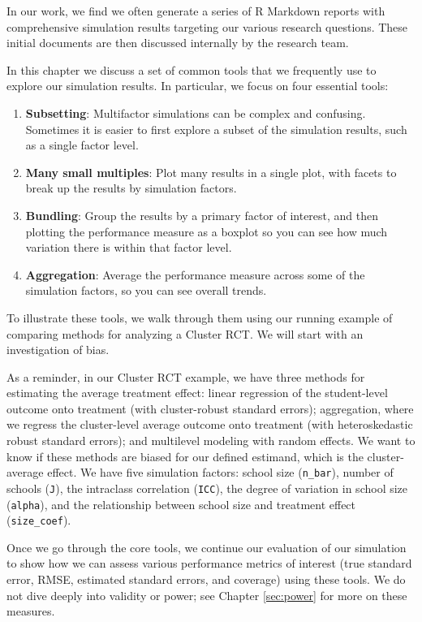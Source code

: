 \documentclass[
]{book}
\providecommand{\tightlist}{%
  \setlength{\itemsep}{0pt}\setlength{\parskip}{0pt}}
\begin{document}
In our work, we find we often generate a series of R Markdown reports with comprehensive simulation results targeting our various research questions.
These initial documents are then discussed internally by the research team.

In this chapter we discuss a set of common tools that we frequently use to explore our simulation results.
In particular, we focus on four essential tools:

\begin{enumerate}
\def\labelenumi{\arabic{enumi}.}
\tightlist
\item
  \textbf{Subsetting}: Multifactor simulations can be complex and confusing. Sometimes it is easier to first explore a subset of the simulation results, such as a single factor level.
\item
  \textbf{Many small multiples}: Plot many results in a single plot, with facets to break up the results by simulation factors.
\item
  \textbf{Bundling}: Group the results by a primary factor of interest, and then plotting the performance measure as a boxplot so you can see how much variation there is within that factor level.
\item
  \textbf{Aggregation}: Average the performance measure across some of the simulation factors, so you can see overall trends.
\end{enumerate}

To illustrate these tools, we walk through them using our running example of comparing methods for analyzing a Cluster RCT.
We will start with an investigation of bias.

As a reminder, in our Cluster RCT example, we have three methods for estimating the average treatment effect: linear regression of the student-level outcome onto treatment (with cluster-robust standard errors); aggregation, where we regress the cluster-level average outcome onto treatment (with heteroskedastic robust standard errors); and multilevel modeling with random effects.
We want to know if these methods are biased for our defined estimand, which is the cluster-average effect.
We have five simulation factors: school size (\texttt{n\_bar}), number of schools (\texttt{J}), the intraclass correlation (\texttt{ICC}), the degree of variation in school size (\texttt{alpha}), and the relationship between school size and treatment effect (\texttt{size\_coef}).

Once we go through the core tools, we continue our evaluation of our simulation to show how we can assess various performance metrics of interest (true standard error, RMSE, estimated standard errors, and coverage) using these tools.
We do not dive deeply into validity or power; see Chapter \ref{sec:power} for more on these measures.
\end{document}
